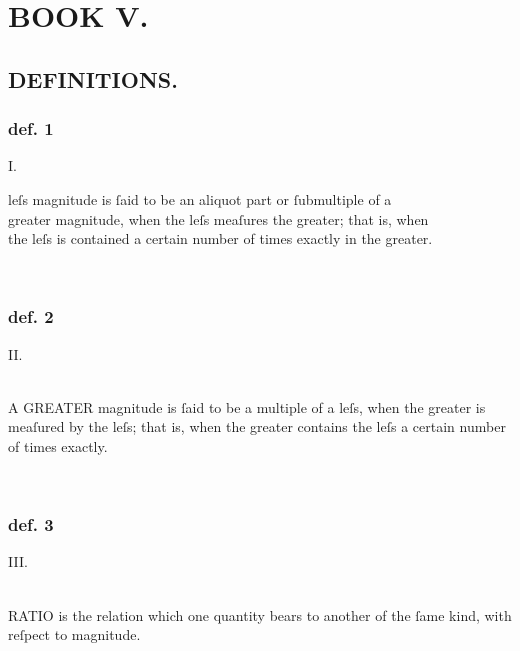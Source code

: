 \pagestyle{fancy}
\fancyhf{}
\renewcommand{\headrulewidth}{0pt}
%

\section[Book V]{\centering BOOK V.}
\label{sec:book5}

\hfill

\subsection[Definitions]{\centering \scshape{\LARGE{DEFINITIONS.}}}
\label{subsec:definitions}

\hfill

\begin{center}
    \begin{minipage}{0.8\textwidth}
        \subsubsection{def. 1}
        \begin{center}
            I.\label{book5def1}\\
            \raggedright \lettrine[lines=4, loversize=1, nindent=0pt]{}{} leſs magnitude is ſaid to be an aliquot part or ſubmultiple of a\\ greater magnitude, when the leſs meaſures the greater; that is, when\\ the leſs is contained a certain number of times exactly in the greater.
        \end{center}
        \hfill\\
        \subsubsection{def. 2}
        \begin{center}
            II.\label{book5def2}\\
            \hfill\\
            \raggedright A \textsc{GREATER} magnitude is ſaid to be a multiple of a leſs, when the greater is meaſured by the leſs; that is, when the greater contains the leſs a certain number of times exactly.
        \end{center}
        \hfill\\
        \subsubsection{def. 3}
        \begin{center}
            III.\label{book5def3}\\
            \hfill\\
            \raggedright R\textsc{ATIO} is the relation which one quantity bears to another of the ſame kind, with reſpect to magnitude.
        \end{center}
        \hfill\\

\end{minipage}
\end{center}
